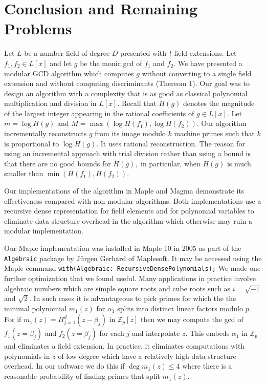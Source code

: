\documentclass[10pt]{article}
\newcommand{\ls}{{\it l}} \newcommand{\ZZ}{{\mathbb Z}} \newcommand{\QQ}{{\mathbb Q}} \newcommand{\NN}{{\mathbb N}} \newcommand{\FF}{{\mathbb F}} \newcommand{\Zmod}[1]{{\mathbb Z}/(#1)} \newcommand{\divides}{\mid}
\begin{document}
 
\section{Conclusion and Remaining Problems}
Let $L$ be a number field of degree $D$ presented with $\ls$ field extensions.
Let $f_1, f_2 \in L[x]$ and let $g$ be the monic gcd of $f_1$ and $f_2$.
We have presented a modular GCD algorithm which computes $g$ without
converting to a single field extension and without computing discriminants (Thereom 1).
Our goal was to design an algorithm with a complexity
that is as good as classical polynomial multiplication and
division in $L[x].$ Recall that $H(g)$ denotes the magnitude of the
largest integer appearing in the rational coefficients of $g \in L[x].$
Let $m = \log H(g)$ and $M = \max( \log H(f_1), \log H(f_2) ).$
Our algorithm incrementally reconstructs $g$ from its image modulo $k$ machine
primes such that $k$ is proportional to $\log H(g).$
It uses rational reconstruction.
The reason for using an incremental approach with trial division
rather than using a bound is that there are no good bounds for $H(g),$
in particular, when $H(g)$ is much smaller than $\min( H(f_1), H(f_2) )$.

Our implementations of the algorithm in Maple and Magma demonstrate its
effectiveness compared with non-modular algorithms.
Both implementations use a recursive dense representation
for field elements and for polynomial variables to eliminate data
structure overhead in the algorithm which otherwise may
ruin a modular implementation.

Our Maple implementation was installed in Maple 10 in 2005
as part of the {\tt Algebraic} package by J\"urgen Gerhard of Maplesoft.
It may be accessed using the Maple command
{\tt with(Algebraic:-RecursiveDensePolynomials);}
We made one further optimization that we found useful.
Many applications in practice involve algebraic numbers which are
simple square roots and cube roots such as $i=\sqrt{-1}$ and $\sqrt 2$.
In such cases it is advantageous to pick primes for which the 
the minimal polynomial $m_1(z)$ for $\alpha_1$ splits into distinct 
linear factors modulo $p$.  For if $m_1(z) = \Pi_{j=1}^d (z-\beta_j)$ in $\ZZ_p[z]$
then we may compute the gcd of $f_1(z=\beta_j)$ and $f_2(z=\beta_j)$
for each $j$ and interpolate $z$.  
This embeds $\alpha_1$ in $\ZZ_p$ and eliminates a field extension.
In practice, it eliminates computations with polynomials in $z$ of
low degree which have a relatively high data structure overhead.
In our software we do this if $\deg m_1(z) \le 4$ where
there is a reasonable probability of finding primes that split $m_1(z)$.
\end{document}
